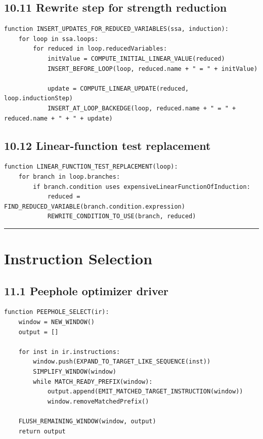 \documentclass[10pt,letterpaper]{article}
\begin{document}
\subsection*{10.11 Rewrite step for strength reduction}

\begin{verbatim}
function INSERT_UPDATES_FOR_REDUCED_VARIABLES(ssa, induction):
    for loop in ssa.loops:
        for reduced in loop.reducedVariables:
            initValue = COMPUTE_INITIAL_LINEAR_VALUE(reduced)
            INSERT_BEFORE_LOOP(loop, reduced.name + " = " + initValue)

            update = COMPUTE_LINEAR_UPDATE(reduced, loop.inductionStep)
            INSERT_AT_LOOP_BACKEDGE(loop, reduced.name + " = " + reduced.name + " + " + update)
\end{verbatim}

\subsection*{10.12 Linear-function test replacement}

\begin{verbatim}
function LINEAR_FUNCTION_TEST_REPLACEMENT(loop):
    for branch in loop.branches:
        if branch.condition uses expensiveLinearFunctionOfInduction:
            reduced = FIND_REDUCED_VARIABLE(branch.condition.expression)
            REWRITE_CONDITION_TO_USE(branch, reduced)
\end{verbatim}

\medskip\hrule\medskip

\clearpage
\section{Instruction Selection}

\subsection*{11.1 Peephole optimizer driver}

\begin{verbatim}
function PEEPHOLE_SELECT(ir):
    window = NEW_WINDOW()
    output = []

    for inst in ir.instructions:
        window.push(EXPAND_TO_TARGET_LIKE_SEQUENCE(inst))
        SIMPLIFY_WINDOW(window)
        while MATCH_READY_PREFIX(window):
            output.append(EMIT_MATCHED_TARGET_INSTRUCTION(window))
            window.removeMatchedPrefix()

    FLUSH_REMAINING_WINDOW(window, output)
    return output
\end{verbatim}
\end{document}
